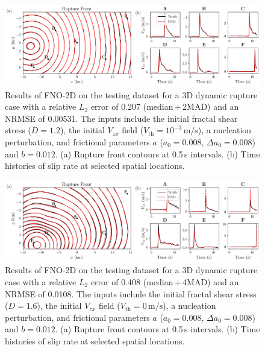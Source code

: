 \documentclass[draft]{agujournal2019}
\begin{document}
\begin{figure}
    \centering
    \includegraphics[width=1.0\linewidth]{app_med_2mad.png}
    \caption{\label{fig:app_med_2mad} Results of FNO-2D on the testing dataset for a 3D dynamic rupture case with a relative \(L_2\) error of 0.207 (median\,+\,2MAD) and an NRMSE of 0.00531. The inputs include the initial fractal shear stress (\(D = 1.2\)), the initial \(V_{zx}\) field (\(V_\text{th} = 10^{-3}\,\mathrm{m/s}\)), a nucleation perturbation, and frictional parameters \(a\) (\(a_0 = 0.008\), \(\Delta a_0 = 0.008\)) and \(b = 0.012\). (a) Rupture front contours at 0.5\,s intervals. (b) Time histories of slip rate at selected spatial locations.}
\end{figure}

\begin{figure}
    \centering
    \includegraphics[width=1.0\linewidth]{app_med_4mad.png}
    \caption{\label{fig:app_med_4mad} Results of FNO-2D on the testing dataset for a 3D dynamic rupture case with a relative \(L_2\) error of 0.408 (median\,+\,4MAD) and an NRMSE of 0.0108. The inputs include the initial fractal shear stress (\(D = 1.6\)), the initial \(V_{zx}\) field (\(V_\text{th} = 0\,\mathrm{m/s}\)), a nucleation perturbation, and frictional parameters \(a\) (\(a_0 = 0.008\), \(\Delta a_0 = 0.008\)) and \(b = 0.012\). (a) Rupture front contours at 0.5\,s intervals. (b) Time histories of slip rate at selected spatial locations.}
\end{figure}
\end{document}
